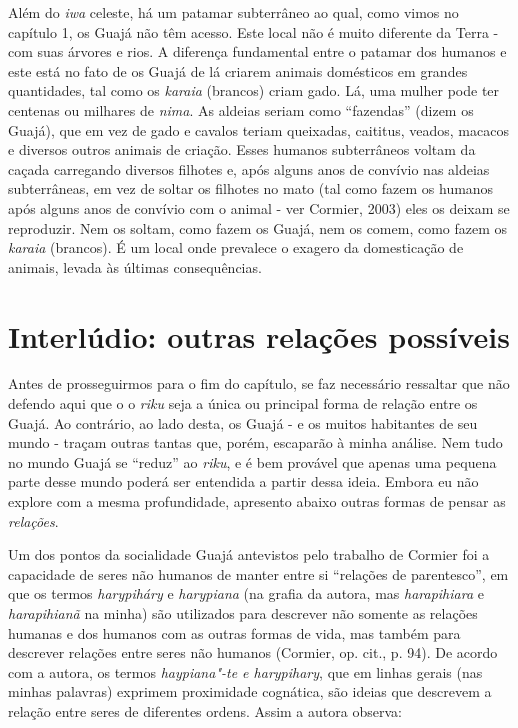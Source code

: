 Além do \emph{iwa} celeste, há um patamar subterrâneo ao qual, como
vimos no capítulo 1, os Guajá não têm acesso. Este local não é muito
diferente da Terra - com suas árvores e rios. A diferença fundamental
entre o patamar dos humanos e este está no fato de os Guajá de lá
criarem animais domésticos em grandes quantidades, tal como os
\emph{karaia} (brancos) criam gado. Lá, uma mulher pode ter centenas ou
milhares de \emph{nima}. As aldeias seriam como ``fazendas'' (dizem os
Guajá), que em vez de gado e cavalos teriam queixadas, caititus, veados,
macacos e diversos outros animais de criação. Esses humanos subterrâneos
voltam da caçada carregando diversos filhotes e, após alguns anos de
convívio nas aldeias subterrâneas, em vez de soltar os filhotes no mato
(tal como fazem os humanos após alguns anos de convívio com o animal -
ver Cormier, 2003) eles os deixam se reproduzir. Nem os soltam, como
fazem os Guajá, nem os comem, como fazem os \emph{karaia} (brancos). É
um local onde prevalece o exagero da domesticação de animais, levada às
últimas consequências.

\section{Interlúdio: outras relações
possíveis}\label{interluxfadio-outras-relauxe7uxf5es-possuxedveis}

Antes de prosseguirmos para o fim do capítulo, se faz necessário
ressaltar que não defendo aqui que o o \emph{riku} seja a única ou
principal forma de relação entre os Guajá. Ao contrário, ao lado desta,
os Guajá - e os muitos habitantes de seu mundo - traçam outras tantas
que, porém, escaparão à minha análise. Nem tudo no mundo Guajá se
``reduz'' ao \emph{riku}, e é bem provável que apenas uma pequena parte
desse mundo poderá ser entendida a partir dessa ideia. Embora eu não
explore com a mesma profundidade, apresento abaixo outras formas de
pensar as \emph{relações}.

Um dos pontos da socialidade Guajá antevistos pelo trabalho de Cormier
foi a capacidade de seres não humanos de manter entre si ``relações de
parentesco'', em que os termos \emph{harypiháry} e \emph{harypiana} (na
grafia da autora, mas \emph{harapihiara} e \emph{harapihianã} na minha)
são utilizados para descrever não somente as relações humanas e dos
humanos com as outras formas de vida, mas também para descrever relações
entre seres não humanos (Cormier, op. cit., p. 94). De acordo com a
autora, os termos \emph{haypiana"-te e harypihary}, que em linhas gerais
(nas minhas palavras) exprimem proximidade cognática, são ideias que
descrevem a relação entre seres de diferentes ordens. Assim a autora
observa:

